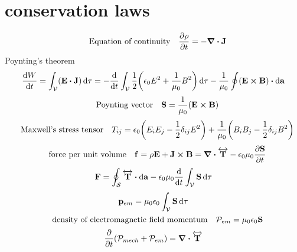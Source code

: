 
\section*{conservation laws}
\[\qq{Equation of continuity} \pdv{\rho}{t}=-\div{\vb{J}}\]
Poynting's theorem
\[\dv{W}{t}=\int_{\mathcal{V}}(\vb{E}\vdot{\vb{J}})\dd{\tau}=-\dv{t}\int_{\mathcal{V}}\frac{1}{2}\qty(\epsilon_0E^2+\frac{1}{\mu_0}B^2)\dd{\tau}-\frac{1}{\mu_0}\oint(\vb{E}\cp\vb{B})\vdot\dd{\vb{a}}\]
\[\qq{Poynting vector}\vb{S}=\frac{1}{\mu_0}(\vb{E}\cp\vb{B})\]
\[\qq{Maxwell's stress tensor} T_{ij}=\epsilon_0\qty(E_iE_j-\frac{1}{2}\delta_{ij}E^2)+\frac{1}{\mu_0}\qty(B_iB_j-\frac{1}{2}\delta_{ij}B^2)\]
\[\qq{force per unit volume} \vb{f}=\rho\vb{E}+\vb{J}\cp\vb{B}=\div{\overleftrightarrow{\vb{T}}}-\epsilon_0\mu_0\pdv{\vb{S}}{t}\]
\[\vb{F}=\oint_{\mathcal{S}}\overleftrightarrow{\vb{T}}\vdot\dd{\vb{a}}-\epsilon_0\mu_0\dv{t}\int_{\mathcal{V}}\vb{S}\dd{\tau}\]
\[\vb{p}_{em}=\mu_0\epsilon_0\int_{\mathcal{V}}\vb{S}\dd{\tau}\]
\[\qq{density of electromagnetic field momentum}\mathcal{P}_{em}=\mu_0\epsilon_0\vb{S}\]
\[\pdv{t}(\mathcal{P}_{mech}+\mathcal{P}_{em})=\div{\overleftrightarrow{\vb{T}}}\]
